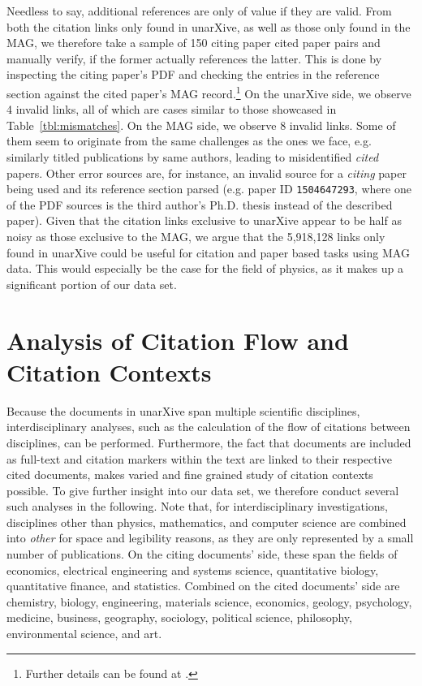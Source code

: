 Needless to say, additional references are only of value if they are valid. From both the citation links only found in unarXive, as well as those only found in the MAG, we therefore take a sample of 150 citing paper cited paper pairs and manually verify, if the former actually references the latter. This is done by inspecting the citing paper's PDF and checking the entries in the reference section against the cited paper's MAG record.\footnote{Further details can be found at .} On the unarXive side, we observe 4 invalid links, all of which are cases similar to those showcased in Table~\ref{tbl:mismatches}. On the MAG side, we observe 8 invalid links. Some of them seem to originate from the same challenges as the ones we face, e.g. similarly titled publications by same authors, leading to misidentified \emph{cited} papers. Other error sources are, for instance, an invalid source for a \emph{citing} paper being used and its reference section parsed (e.g. paper ID \texttt{1504647293}, where one of the PDF sources is the third author's Ph.D. thesis instead of the described paper). Given that the citation links exclusive to unarXive appear to be half as noisy as those exclusive to the MAG, we argue that the 5,918,128 links only found in unarXive could be useful for citation and paper based tasks using MAG data. This would especially be the case for the field of physics, as it makes up a significant portion of our data set.

\section{Analysis of Citation Flow and Citation Contexts}
\label{sec:analysis}

Because the documents in unarXive span multiple scientific disciplines, interdisciplinary analyses, such as the calculation of the flow of citations between disciplines, can be performed. Furthermore, the fact that documents are included as full-text and citation markers within the text are linked to their respective cited documents, makes varied and fine grained study of citation contexts possible. To give further insight into our data set, we therefore conduct several such analyses in the following. Note that, for interdisciplinary investigations, disciplines other than physics, mathematics, and computer science are combined into \emph{other} for space and legibility reasons, as they are only represented by a small number of publications. On the citing documents' side, these span the fields of economics, electrical engineering and systems science, quantitative biology, quantitative finance, and statistics. Combined on the cited documents' side are chemistry, biology, engineering, materials science, economics, geology, psychology, medicine, business, geography, sociology, political science, philosophy, environmental science, and art.

